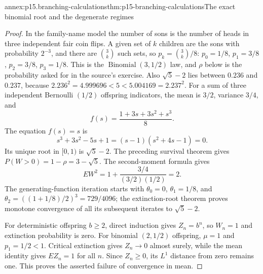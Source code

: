 \begin{annexitem}{annex:p15.branching-calculations}{thm:p15-branching-calculations}{The exact binomial root and the degenerate regimes}
\begin{proof}
In the family-name model the number of sons is the number of heads in
three independent fair coin flips. A given set of \(k\) children are
the sons with probability \(2^{-3}\), and there are
\(\binom3k\) such sets, so
\(p_k=\binom3k/8\): \(p_0=1/8\), \(p_1=3/8\), \(p_2=3/8\),
\(p_3=1/8\). This is the \(\operatorname{Binomial}(3,1/2)\) law, and
\(\rho\) below is the probability asked for in the source's exercise.
Also \(\sqrt5-2\) lies between \(0.236\) and \(0.237\), because
\(2.236^2=4.999696<5<5.004169=2.237^2\).
For a sum of three independent Bernoulli \((1/2)\) offspring
indicators, the mean is \(3/2\), variance \(3/4\), and
\[
                           f(s)=\frac{1+3s+3s^2+s^3}{8}.
\]
The equation \(f(s)=s\) is
\[
               s^3+3s^2-5s+1=(s-1)(s^2+4s-1)=0.
\]
Its unique root in \([0,1)\) is \(\sqrt5-2\).
The preceding survival theorem gives
\(P(W>0)=1-\rho=3-\sqrt5\).
The second-moment formula gives
\[
                         EW^2=1+\frac{3/4}{(3/2)(1/2)}=2.
\]
The generating-function iteration starts with
\(\theta_0=0\), \(\theta_1=1/8\), and
\(\theta_2=((1+1/8)/2)^3=729/4096\);
the extinction-root theorem proves monotone convergence of all
its subsequent iterates to \(\sqrt5-2\).

For deterministic offspring \(b\geq2\), direct induction gives
\(Z_n=b^n\), so \(W_n=1\) and extinction probability is zero.
For binomial \((2,1/2)\) offspring, \(\mu=1\) and \(p_1=1/2<1\).
Critical extinction gives \(Z_n\to0\) almost surely, while the
mean identity gives \(EZ_n=1\) for all \(n\).
Since \(Z_n\geq0\), its \(L^1\) distance from zero remains one.
This proves the asserted failure of convergence in mean.
\end{proof}
\end{annexitem}

